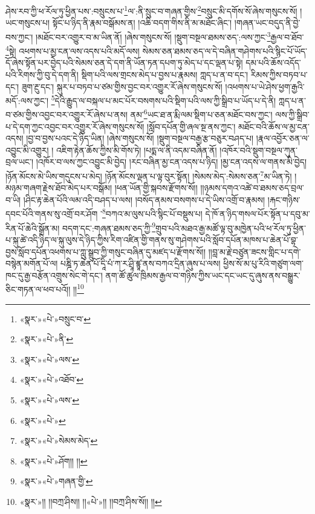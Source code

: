ཤེས་རབ་ཀྱི་ཕ་རོལ་ཏུ་ཕྱིན་པས་:བསྲུངས་པ་\footnote{«སྣར་»«པེ་»བསྲུང་བ་}ལ་:ནི་སྲུང་བ་གཞན་གྱིས་\footnote{«སྣར་»«པེ་»ནི་}བསྲུང་མི་དགོས་སོ་ཞེས་གསུངས་སོ། །ཡང་གསུངས་པ། སྟོང་པ་ཉིད་ནི་རྣམ་བསྒོམས་ན། །འཆི་བདག་གིས་ནི་མ་མཐོང་ཞིང་། །གཞན་ཡང་བདུད་ནི་བྱེ་བས་ཀྱང་། །མཐོང་བར་འགྱུར་བ་མ་ཡིན་ནོ། །ཞེས་གསུངས་སོ། །སྡུག་བསྔལ་ཐམས་ཅད་:ལས་ཀྱང་\footnote{«སྣར་»«པེ་»ལས་}རྒྱལ་བ་ཐོབ་\footnote{«སྣར་»«པེ་»འཐོབ་}སྟེ། འཕགས་པ་མྱ་ངན་ལས་འདས་པའི་མདོ་ལས། སེམས་ཅན་ཐམས་ཅད་ལ་དེ་བཞིན་གཤེགས་པའི་སྙིང་པོ་ཡོད་དོ་ཞེས་སྟོན་པར་བྱེད་པའི་སེམས་ཅན་དེ་དག་ནི་ཡོན་ཏན་དཔག་ཏུ་མེད་པ་དང་ལྡན་པ་སྟེ། དམ་པའི་ཆོས་འདོད་པའི་རིགས་ཀྱི་བུ་དེ་དག་ནི། སྡིག་པའི་ལས་གྲངས་མེད་པ་བྱས་པ་རྣམས། ཀླད་པ་ན་བ་དང་། རིམས་ཀྱིས་བཏབ་པ་དང་། ཟུག་རྔུ་དང་། སྐུར་པ་བཏབ་པ་ཙམ་གྱིས་བྱང་བར་འགྱུར་རོ་ཞེས་གསུངས་སོ། །འཕགས་པ་ཡེ་ཤེས་ཕྱག་རྒྱའི་མདོ་:ལས་ཀྱང་། \footnote{«སྣར་»«པེ་»ལས་}དེའི་རྒྱུད་ལ་བསྐལ་པ་མང་པོར་བསགས་པའི་སྡིག་པའི་ལས་ཀྱི་སྒྲིབ་པ་ཡོད་པ་དེ་ནི། ཀླད་པ་ན་བ་ཙམ་གྱིས་འབྱང་བར་འགྱུར་རོ་ཞེས་པ་ནས། ནམ་\footnote{«སྣར་»«པེ་»}ཡང་ཐ་ན་རྨི་ལམ་སྡིག་པ་ཅན་མཐོང་བས་ཀྱང་། ལས་ཀྱི་སྒྲིབ་པ་དེ་དག་ཀྱང་འབྱང་བར་འགྱུར་རོ་ཞེས་གསུངས་སོ། །སློབ་དཔོན་གྱི་ཞལ་སྔ་ནས་ཀྱང་། མཐོང་བའི་ཆོས་ལ་མྱ་ངན་འདས། །བྱ་བ་བྱས་པའང་དེ་ཉིད་ཡིན། །ཞེས་གསུངས་སོ། །སྡུག་བསྔལ་བརྒྱ་རྩ་བཅུར་བཤད་པ། །རྣལ་འབྱོར་ཅན་ལ་འབྱུང་མི་འགྱུར། །
འཇིག་རྟེན་ཆོས་ཀྱིས་མི་གོས་ཏེ། །པདྨ་ལ་ནི་འདམ་བཞིན་ནོ། །འཁོར་བའི་སྡུག་བསྔལ་ཀུན་བྲལ་ཡང་། །འཁོར་བ་ལས་ཀྱང་འབྱུང་མི་བྱེད། །རང་བཞིན་མྱ་ངན་འདས་པ་ཉིད། །མྱ་ངན་འདས་ལ་གནས་མི་བྱེད། །ཉོན་མོངས་མེ་ཡིས་གདུངས་པ་མེད། །ཉོན་མོངས་ལྡན་པ་ལྟ་བུར་སྟོན། །སེམས་མེད་:སེམས་ཅན་\footnote{«སྣར་»«པེ་»སེམས་མེད་}མ་ཡིན་ཏེ། །མཉམ་གཞག་རྗེས་ཐོབ་མེད་པར་བསྒོམ། །ཕན་ཡོན་གྱི་སྐབས་རྫོགས་སོ།། །།ཉམས་དགའ་འཚེ་བ་ཐམས་ཅད་བྲལ་བ་ཡི། །ཤིང་རྟ་ཆེན་པོའི་ལམ་འདི་བཤད་པ་ལས། །བསོད་ནམས་བསགས་པ་དེ་ཡིས་འགྲོ་བ་རྣམས། །རྐང་གཉིས་དབང་པོའི་གནས་སུ་འགྲོ་བར་ཤོག ་\footnote{«སྣར་»«པེ་»ཤོག།། །།}བཀའ་མ་ལུས་པའི་སྙིང་པོ་བསྡུས་པ། དེ་ཁོ་ན་ཉིད་གསལ་པོར་སྟོན་པ་དབུ་མ་རིན་པོ་ཆེའི་སྒྲོན་མ། བདག་དང་:གཞན་ཐམས་ཅད་ཀྱི་\footnote{«སྣར་»«པེ་»གཞན་གྱི་}གྲུབ་པའི་མཐའ་རྒྱ་མཚོ་ལྟ་བུ་མཁྱེན་པའི་ཕ་རོལ་ཏུ་ཕྱིན་པ་སྐུ་ཚེ་འདི་ཉིད་ལ་སྐུ་ལུས་དེ་ཉིད་ཀྱིས་རིག་འཛིན་གྱི་གནས་སུ་གཤེགས་པའི་སློབ་དཔོན་མཁས་པ་ཆེན་པོ་བྷ་བྱས་སློབ་དཔོན་འཕགས་པ་ཀླུ་སྒྲུབ་ཀྱི་གསུང་བཞིན་དུ་མཛད་པ་རྫོགས་སོ།། །།བླ་མ་རྗེ་བཙུན་ཟངས་གླིང་པ་དགེ་བསྙེན་མགོན་པོ་ལ། པཎྜི་ཏ་ཆེན་པོ་དཱི་པཾ་ཀ་ར་ཤྲཱི་ཛྙཱ་ནས་བཀའ་དྲིན་ཞུས་པ་ལས། ཕྱིས་སོ་མ་པུ་རིའི་གཙུག་ལག་ཁང་དུ་རྒྱ་བརྩོན་འགྲུས་སེང་གེ་དང་། ནག་ཚོ་ཚུལ་ཁྲིམས་རྒྱལ་བ་གཉིས་ཀྱིས་ཡང་དང་ཡང་དུ་ཞུས་ནས་བསྒྱུར་ཅིང་གཏན་ལ་ཕབ་པའོ།། །།\footnote{«སྣར་»།། །།བཀྲ་ཤིས།། །།«པེ་»།། །།བཀྲ་ཤིས་སོ།། །།}